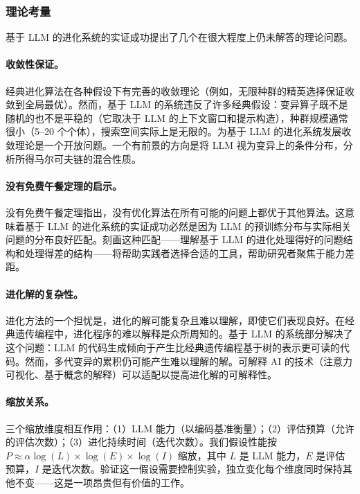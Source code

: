 \subsubsection{理论考量}

基于 LLM 的进化系统的实证成功提出了几个在很大程度上仍未解答的理论问题。

\paragraph{收敛性保证。}
经典进化算法在各种假设下有完善的收敛理论（例如，无限种群的精英选择保证收敛到全局最优）。然而，基于 LLM 的系统违反了许多经典假设：变异算子既不是随机的也不是平稳的（它取决于 LLM 的上下文窗口和提示构造），种群规模通常很小（5--20 个个体），搜索空间实际上是无限的。为基于 LLM 的进化系统发展收敛理论是一个开放问题。一个有前景的方向是将 LLM 视为变异上的条件分布，分析所得马尔可夫链的混合性质。

\paragraph{没有免费午餐定理的启示。}
没有免费午餐定理指出，没有优化算法在所有可能的问题上都优于其他算法。这意味着基于 LLM 的进化系统的实证成功必然是因为 LLM 的预训练分布与实际相关问题的分布良好匹配。刻画这种匹配——理解基于 LLM 的进化处理得好的问题结构和处理得差的结构——将帮助实践者选择合适的工具，帮助研究者聚焦于能力差距。

\paragraph{进化解的复杂性。}
进化方法的一个担忧是，进化的解可能复杂且难以理解，即使它们表现良好。在经典遗传编程中，进化程序的难以解释是众所周知的。基于 LLM 的系统部分解决了这个问题：LLM 的代码生成倾向于产生比经典遗传编程基于树的表示更可读的代码。然而，多代变异的累积仍可能产生难以理解的解。可解释 AI 的技术（注意力可视化、基于概念的解释）可以适配以提高进化解的可解释性。

\paragraph{缩放关系。}
三个缩放维度相互作用：（1）LLM 能力（以编码基准衡量）；（2）评估预算（允许的评估次数）；（3）进化持续时间（迭代次数）。我们假设性能按 $P \approx \alpha \log(L) \times \log(E) \times \log(I)$ 缩放，其中 $L$ 是 LLM 能力，$E$ 是评估预算，$I$ 是迭代次数。验证这一假设需要控制实验，独立变化每个维度同时保持其他不变——这是一项昂贵但有价值的工作。


